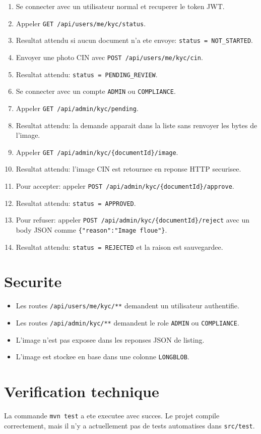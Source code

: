 \documentclass[12pt,a4paper]{article}
\begin{document}
\begin{enumerate}
    \item Se connecter avec un utilisateur normal et recuperer le token JWT.
    \item Appeler \texttt{GET /api/users/me/kyc/status}.
    \item Resultat attendu si aucun document n'a ete envoye: \texttt{status = NOT\_STARTED}.
    \item Envoyer une photo CIN avec \texttt{POST /api/users/me/kyc/cin}.
    \item Resultat attendu: \texttt{status = PENDING\_REVIEW}.
    \item Se connecter avec un compte \texttt{ADMIN} ou \texttt{COMPLIANCE}.
    \item Appeler \texttt{GET /api/admin/kyc/pending}.
    \item Resultat attendu: la demande apparait dans la liste sans renvoyer les bytes de l'image.
    \item Appeler \texttt{GET /api/admin/kyc/\{documentId\}/image}.
    \item Resultat attendu: l'image CIN est retournee en reponse HTTP securisee.
    \item Pour accepter: appeler \texttt{POST /api/admin/kyc/\{documentId\}/approve}.
    \item Resultat attendu: \texttt{status = APPROVED}.
    \item Pour refuser: appeler \texttt{POST /api/admin/kyc/\{documentId\}/reject} avec un body JSON comme \texttt{\{"reason":"Image floue"\}}.
    \item Resultat attendu: \texttt{status = REJECTED} et la raison est sauvegardee.
\end{enumerate}

\section{Securite}

\begin{itemize}
    \item Les routes \texttt{/api/users/me/kyc/**} demandent un utilisateur authentifie.
    \item Les routes \texttt{/api/admin/kyc/**} demandent le role \texttt{ADMIN} ou \texttt{COMPLIANCE}.
    \item L'image n'est pas exposee dans les reponses JSON de listing.
    \item L'image est stockee en base dans une colonne \texttt{LONGBLOB}.
\end{itemize}

\section{Verification technique}

La commande \texttt{mvn test} a ete executee avec succes.
Le projet compile correctement, mais il n'y a actuellement pas de tests automatises dans \texttt{src/test}.
\end{document}
